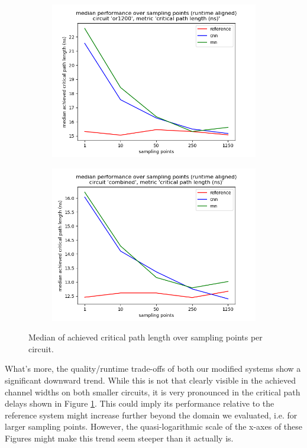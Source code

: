 \begin{figure}
\begin{subfigure}[b]{0.49\linewidth}
	\end{subfigure}
	\begin{subfigure}[b]{0.49\linewidth}
		\includegraphics[width=\linewidth]{plots/eval-or1200-critical-path-median-full.png}
	\end{subfigure}
	\begin{subfigure}[b]{0.49\linewidth}
		\includegraphics[width=\linewidth]{plots/eval-combined-critical-path-median-full.png}
	\end{subfigure}
	\caption{Median of achieved critical path length over sampling points per circuit.}
	\label{fig:eval-critical-path-median}
\end{figure}

What's more, the quality/runtime trade-offs of both our modified systems show a significant downward trend. While this is not that clearly visible in the achieved channel widths on both smaller circuits, it is very pronounced in the critical path delays shown in Figure \ref{fig:eval-critical-path-median}. This could imply its performance relative to the reference system might increase further beyond the domain we evaluated, i.e. for larger sampling points. However, the quasi-logarithmic scale of the x-axes of these Figures might make this trend seem steeper than it actually is.

